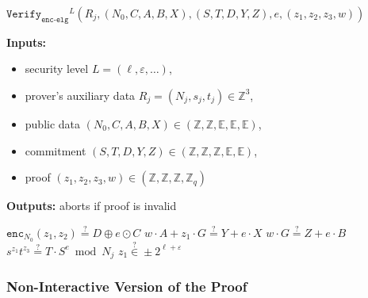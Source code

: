 \documentclass[11pt]{article}
\newenvironment{inlineAlgorithm}{}{}
\newcommand{\algoName}[1]{#1 \par}
\newcommand{\algoInputsList}[1]{
    {\small \bf Inputs:} 
        \begin{itemize}[noitemsep,topsep=0pt]
            #1
        \end{itemize}
}
\newcommand{\algoOutputs}[1]{
    {\small \bf Outputs:} #1 \par
}
\newcommand{\enc}{\ensuremath{\mathtt{enc}}}
\newcommand{\verify}[1]{\ensuremath{\mathtt{Verify}_{\mathtt{#1}}}}
\newcommand{\E}{\mathbb{E}}
\newcommand{\Z}{\mathbb{Z}}
\newcommand{\?}[1]{\stackrel{?}{#1}}
\begin{document}
\begin{description}
\item
\begin{inlineAlgorithm}
\algoName{$\verify{enc\mbox{-}elg}^L(R_j, (N_0, C, A, B, X), (S, T, D, Y, Z), e, (z_1, z_2, z_3, w))$}
\algoInputsList{
    \item security level $L = (\ell, \varepsilon, \dots)$,
    \item prover's auxiliary data $R_j = (N_j, s_j, t_j) \in \Z^3$,
    \item public data $(N_0, C, A, B, X) \in (\Z, \Z, \E, \E, \E)$,
    \item commitment $(S, T, D, Y, Z) \in (\Z, \Z, \Z, \E, \E)$,
    \item proof $(z_1, z_2, z_3, w) \in (\Z, \Z, \Z, \Z_q)$
}
\algoOutputs{aborts if proof is invalid}
\begin{algorithmic}[1]
\State $\enc_{N_0}(z_1, z_2) \? = D \oplus e \odot C$
\State $w \cdot A + z_1 \cdot G \? = Y + e \cdot X$
\State $w \cdot G \? = Z + e \cdot B$
\State $s^{z_1} t^{z_3} \? = T \cdot S^e \bmod N_j$
\State $z_1 \? \in \pm 2^{\ell + \varepsilon}$
\end{algorithmic}
\end{inlineAlgorithm}

\end{description}

\subsubsection{Non-Interactive Version of the Proof}
\end{document}
